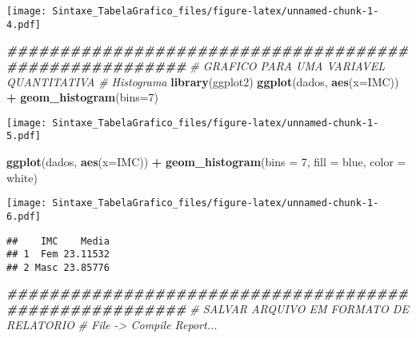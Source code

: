 \documentclass[
]{article}
\newenvironment{Shaded}{\begin{snugshade}}{\end{snugshade}}
\newcommand{\AttributeTok}[1]{\textcolor[rgb]{0.13,0.29,0.53}{#1}}
\newcommand{\CommentTok}[1]{\textcolor[rgb]{0.56,0.35,0.01}{\textit{#1}}}
\newcommand{\DecValTok}[1]{\textcolor[rgb]{0.00,0.00,0.81}{#1}}
\newcommand{\DocumentationTok}[1]{\textcolor[rgb]{0.56,0.35,0.01}{\textbf{\textit{#1}}}}
\newcommand{\FunctionTok}[1]{\textcolor[rgb]{0.13,0.29,0.53}{\textbf{#1}}}
\newcommand{\NormalTok}[1]{#1}
\newcommand{\OtherTok}[1]{\textcolor[rgb]{0.56,0.35,0.01}{#1}}
\newcommand{\SpecialCharTok}[1]{\textcolor[rgb]{0.81,0.36,0.00}{\textbf{#1}}}
\newcommand{\StringTok}[1]{\textcolor[rgb]{0.31,0.60,0.02}{#1}}
\begin{document}
\texttt{[image: Sintaxe\_TabelaGrafico\_files/figure-latex/unnamed-chunk-1-4.pdf]}

\begin{Shaded}
\begin{Highlighting}[]
\DocumentationTok{\#\#\#\#\#\#\#\#\#\#\#\#\#\#\#\#\#\#\#\#\#\#\#\#\#\#\#\#\#\#\#\#\#\#\#\#\#\#\#\#\#\#\#\#\#\#\#\#\#\#\#\#\#\#\#}
\CommentTok{\# GRAFICO PARA UMA VARIAVEL QUANTITATIVA}
\CommentTok{\# Histograma}
\FunctionTok{library}\NormalTok{(ggplot2)}
\FunctionTok{ggplot}\NormalTok{(dados, }\FunctionTok{aes}\NormalTok{(}\AttributeTok{x=}\NormalTok{IMC)) }\SpecialCharTok{+} 
  \FunctionTok{geom\_histogram}\NormalTok{(}\AttributeTok{bins=}\DecValTok{7}\NormalTok{)}
\end{Highlighting}
\end{Shaded}

\texttt{[image: Sintaxe\_TabelaGrafico\_files/figure-latex/unnamed-chunk-1-5.pdf]}

\begin{Shaded}
\begin{Highlighting}[]
\FunctionTok{ggplot}\NormalTok{(dados, }\FunctionTok{aes}\NormalTok{(}\AttributeTok{x=}\NormalTok{IMC)) }\SpecialCharTok{+} 
  \FunctionTok{geom\_histogram}\NormalTok{(}\AttributeTok{bins =} \DecValTok{7}\NormalTok{, }\AttributeTok{fill =} \StringTok{\textquotesingle{}blue\textquotesingle{}}\NormalTok{, }\AttributeTok{color =} \StringTok{\textquotesingle{}white\textquotesingle{}}\NormalTok{)}
\end{Highlighting}
\end{Shaded}

\texttt{[image: Sintaxe\_TabelaGrafico\_files/figure-latex/unnamed-chunk-1-6.pdf]}

\begin{Shaded}
\end{Shaded}

\begin{verbatim}
##    IMC    Media
## 1  Fem 23.11532
## 2 Masc 23.85776
\end{verbatim}

\begin{Shaded}
\begin{Highlighting}[]
\DocumentationTok{\#\#\#\#\#\#\#\#\#\#\#\#\#\#\#\#\#\#\#\#\#\#\#\#\#\#\#\#\#\#\#\#\#\#\#\#\#\#\#\#\#\#\#\#\#\#\#\#\#\#\#\#\#\#\#}
\CommentTok{\# SALVAR ARQUIVO EM FORMATO DE RELATORIO}
\CommentTok{\# File {-}\textgreater{} Compile Report...}
\end{Highlighting}
\end{Shaded}
\end{document}
